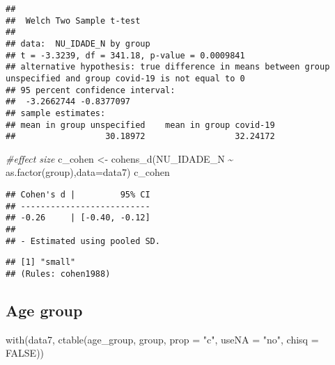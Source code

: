 \documentclass[
]{article}
\newenvironment{Shaded}{\begin{snugshade}}{\end{snugshade}}
\newcommand{\AttributeTok}[1]{\textcolor[rgb]{0.77,0.63,0.00}{#1}}
\newcommand{\CommentTok}[1]{\textcolor[rgb]{0.56,0.35,0.01}{\textit{#1}}}
\newcommand{\ConstantTok}[1]{\textcolor[rgb]{0.00,0.00,0.00}{#1}}
\newcommand{\FunctionTok}[1]{\textcolor[rgb]{0.00,0.00,0.00}{#1}}
\newcommand{\NormalTok}[1]{#1}
\newcommand{\OtherTok}[1]{\textcolor[rgb]{0.56,0.35,0.01}{#1}}
\newcommand{\SpecialCharTok}[1]{\textcolor[rgb]{0.00,0.00,0.00}{#1}}
\newcommand{\StringTok}[1]{\textcolor[rgb]{0.31,0.60,0.02}{#1}}
\begin{document}
\begin{verbatim}
## 
##  Welch Two Sample t-test
## 
## data:  NU_IDADE_N by group
## t = -3.3239, df = 341.18, p-value = 0.0009841
## alternative hypothesis: true difference in means between group unspecified and group covid-19 is not equal to 0
## 95 percent confidence interval:
##  -3.2662744 -0.8377097
## sample estimates:
## mean in group unspecified    mean in group covid-19 
##                  30.18972                  32.24172
\end{verbatim}

\begin{Shaded}
\begin{Highlighting}[]
\CommentTok{\#effect size}
\NormalTok{c\_cohen }\OtherTok{\textless{}{-}} \FunctionTok{cohens\_d}\NormalTok{(NU\_IDADE\_N }\SpecialCharTok{\textasciitilde{}} \FunctionTok{as.factor}\NormalTok{(group),}\AttributeTok{data=}\NormalTok{data7)}
\NormalTok{c\_cohen}
\end{Highlighting}
\end{Shaded}

\begin{verbatim}
## Cohen's d |         95% CI
## --------------------------
## -0.26     | [-0.40, -0.12]
## 
## - Estimated using pooled SD.
\end{verbatim}

\begin{Shaded}
\end{Shaded}

\begin{verbatim}
## [1] "small"
## (Rules: cohen1988)
\end{verbatim}

\hypertarget{age-group}{%
\subsection{Age group}\label{age-group}}

\begin{Shaded}
\begin{Highlighting}[]
\FunctionTok{with}\NormalTok{(data7, }\FunctionTok{ctable}\NormalTok{(age\_group, group, }\AttributeTok{prop =} \StringTok{"c"}\NormalTok{, }\AttributeTok{useNA =} \StringTok{"no"}\NormalTok{, }\AttributeTok{chisq =} \ConstantTok{FALSE}\NormalTok{))}
\end{Highlighting}
\end{Shaded}
\end{document}
